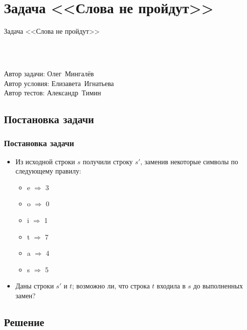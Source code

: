 \section{Задача <<Слова не пройдут>>}


\begin{frame}
    \begin{center}
        \Huge Задача <<Слова не пройдут>>
    \end{center}
    ~\\~\\
    \begin{center}
        Автор задачи: Олег~Мингалёв\\
        Автор условия: Елизавета~Игнатьева\\
        Автор тестов: Александр~Тимин
    \end{center}
\end{frame}

\subsection{Постановка задачи}

\begin{frame}
    \frametitle{Постановка задачи}

    \begin{itemize}
        \item Из исходной строки $s$ получили строку $s'$, заменив некоторые символы по следующему правилу:
        \begin{itemize}
            \item e $\Rightarrow$ 3
            \item o $\Rightarrow$ 0
            \item i $\Rightarrow$ 1
            \item t $\Rightarrow$ 7
            \item a $\Rightarrow$ 4
            \item s $\Rightarrow$ 5
        \end{itemize}
        \item Даны строки $s'$ и $t$; возможно ли, что строка $t$ входила в $s$ до выполненных замен?
    \end{itemize}
\end{frame}

\subsection{Решение}

